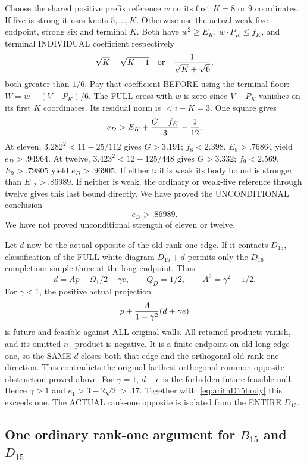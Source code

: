 \documentclass[11pt]{article}
\begin{document}
Choose the shared positive prefix reference \(w\)
on its first \(K=8\) or \(9\) coordinates.
If five is strong it uses knots \(5,\ldots,K\).
Otherwise use the actual weak-five endpoint,
strong six and terminal \(K\).
Both have \(w^2\ge E_K\), \(w\cdot P_K\le f_K\),
and terminal INDIVIDUAL coefficient respectively
\[
 \sqrt K-\sqrt{K-1}\quad\hbox{or}\quad
 {1\over\sqrt K+\sqrt6},
\]
both greater than \(1/6\).
Pay that coefficient BEFORE using the terminal floor:
\(W=w+(V-P_K)/6\).
The FULL cross with \(w\) is zero since \(V-P_K\)
vanishes on its first \(K\) coordinates.
Its residual norm is \(<i-K=3\).
One square gives
\[
                 e_D>E_K+{G-f_K\over3}-{1\over12}.
\]
At eleven,
\(3.282^2<11-25/112\) gives \(G>3.191\);
\(f_8<2.398\), \(E_8>.76864\) yield \(e_D>.94964\).
At twelve,
\(3.423^2<12-125/448\) gives \(G>3.332\);
\(f_9<2.569\), \(E_9>.79805\) yield \(e_D>.96905\).
If either tail is weak its body bound is stronger than
\(E_{12}>.86989\).
If neither is weak, the ordinary or weak-five reference
through twelve gives this last bound directly.
We have proved the UNCONDITIONAL conclusion
\[
                         e_D>.86989 .
\tag{R1D}\label{eq:arithD15body}
\]
We have not proved unconditional strength of eleven or twelve.

Let \(d\) now be the actual opposite of the old rank-one edge.
If it contacts \(D_{15}\), classification of the FULL
white diagram \(D_{15}+d\) permits only the \(D_{16}\)
completion: simple three at the long endpoint.
Thus
\[
 d=Ap-\Omega_1/2-\gamma e,\qquad
 Q_D=1/2,\qquad A^2=\gamma^2-1/2 .
\]
For \(\gamma<1\), the positive actual projection
\[
                  p+{A\over1-\gamma^2}(d+\gamma e)
\]
is future and feasible against ALL original walls.
All retained products vanish, and its omitted \(n_1\)
product is negative.
It is a finite endpoint on old long edge one, so the
SAME \(d\) closes both that edge and the orthogonal
old rank-one direction.
This contradicts the original-farthest orthogonal
common-opposite obstruction proved above.
For \(\gamma=1\), \(d+e\) is the forbidden future
feasible null.
Hence \(\gamma>1\) and
\(e_1>3-2\sqrt2>.17\).
Together with~\eqref{eq:arithD15body} this exceeds one.
The ACTUAL rank-one opposite is isolated from the
ENTIRE \(D_{15}\).

\subsection{One ordinary rank-one argument for \(B_{15}\) and \(D_{15}\)}
\label{app:arithBD15ordinary}
\end{document}
